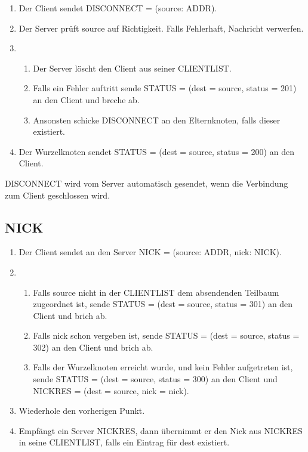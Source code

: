 \documentclass{article}
\begin{document}
\begin{enumerate}
  \item Der Client sendet DISCONNECT = (source: ADDR).
  \item Der Server prüft source auf Richtigkeit. Falls Fehlerhaft, Nachricht verwerfen.
  \item
  \begin{enumerate}
    \item Der Server löscht den Client aus seiner CLIENTLIST.
    \item Falls ein Fehler auftritt sende STATUS = (dest = source, status = 201) an den Client und breche ab.
    \item Ansonsten schicke DISCONNECT an den Elternknoten, falls dieser existiert.
  \end{enumerate}
  \item Der Wurzelknoten sendet STATUS = (dest = source, status = 200) an den Client.
\end{enumerate}
DISCONNECT wird vom Server automatisch gesendet, wenn die Verbindung zum Client geschlossen wird.

\subsection{NICK}

\begin{enumerate}
  \item Der Client sendet an den Server NICK = (source: ADDR, nick: NICK).
  \item
    \begin{enumerate}
      \item Falls source nicht in der CLIENTLIST dem absendenden Teilbaum zugeordnet ist, sende STATUS = (dest = source, status = 301) an den Client und brich ab.
      \item Falls nick schon vergeben ist, sende STATUS = (dest = source, status = 302) an den Client und brich ab.
      \item Falls der Wurzelknoten erreicht wurde, und kein Fehler aufgetreten ist, sende STATUS = (dest = source, status = 300) an den Client und NICKRES = (dest = source, nick = nick).
    \end{enumerate}
  \item Wiederhole den vorherigen Punkt. 
  \item Empfängt ein Server NICKRES, dann übernimmt er den Nick aus NICKRES in seine CLIENTLIST, falls ein Eintrag für dest existiert.
\end{enumerate}
\end{document}
